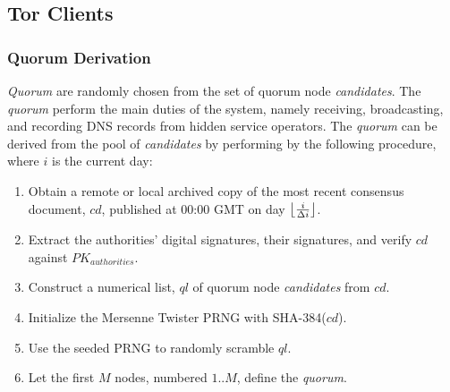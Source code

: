 

\subsection{Tor Clients}
\label{sec:ProtoTorClients}

\subsubsection{Quorum Derivation}

\emph{Quorum} are randomly chosen from the set of quorum node \emph{candidates}. The \emph{quorum} perform the main duties of the system, namely receiving, broadcasting, and recording DNS records from hidden service operators. The \emph{quorum} can be derived from the pool of \emph{candidates} by performing by the following procedure, where $ i $ is the current day:

\begin{enumerate}
	\item Obtain a remote or local archived copy of the most recent consensus document, $ cd $, published at 00:00 GMT on day $ \floor[\big]{\frac{i}{\Delta i}} $.
	\item Extract the authorities' digital signatures, their signatures, and verify $ cd $ against $ PK_{authorities} $.
	\item Construct a numerical list, $ ql $ of quorum node \emph{candidates} from $ cd $.
	\item Initialize the Mersenne Twister PRNG with SHA-384($ cd $).
	\item Use the seeded PRNG to randomly scramble $ ql $.
	\item Let the first $ M $ nodes, numbered $ 1 .. M $, define the \emph{quorum}.
\end{enumerate}

